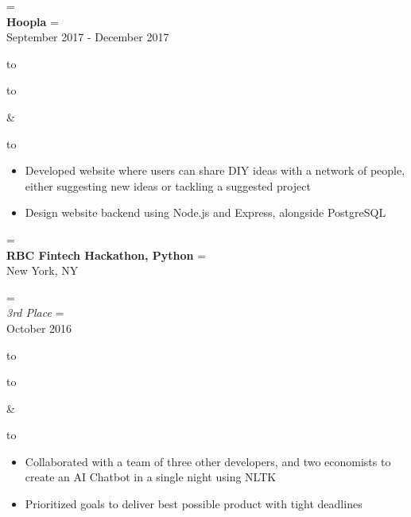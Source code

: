 \documentclass{article}
\newcommand{\appendtotoks}[2]{%
  #1=\expandafter{\the#1#2}%
}
\def\gobble#1{}
\def\gobblefirst#1{%
  #1\expandafter\expandafter\expandafter{\expandafter\gobble\the#1}}
\newcommand{\sectionTitle}[1]{{\Large #1} \vspace{4pt}}
\newenvironment{resumesection}[1]
  {\sectionTitle{#1}}
	{\vspace{10pt}}
\newcommand{\placeStyle}[1]{\textbf{#1}}
\newcommand{\positionStyle}[1]{\textit{#1}}
\newenvironment{newplace}
  {
    \newtoks\leftToks
    \newtoks\rightToks
    \newcommand{\placerow}[2]{%
      \appendtotoks{\leftToks}{\\\placeStyle{##1}}%
      \appendtotoks{\rightToks}{\\##2}}
    \newcommand{\jobrow}[2]{%
      \appendtotoks{\leftToks}{\\\positionStyle{##1}}%
      \appendtotoks{\rightToks}{\\##2}}
    \newcommand{\plainrow}[2]{%
      \appendtotoks{\leftToks}{\\##1}%
      \appendtotoks{\rightToks}{\\##2}}
    \setlength{\tabcolsep}{0pt}%
  }
  {%
    \begin{tabu} to \linewidth [h!]{X[65,l]X[35,r]}
      \begin{tabu} to \linewidth {X}
        \gobblefirst\leftToks
        \the\leftToks
      \end{tabu}
      &
      \begin{tabu} to \linewidth {X[r]}
        \gobblefirst\rightToks
        \the\rightToks
      \end{tabu}
    \end{tabu}%
  }
\newenvironment{bullets}
	{\begin{itemize}[noitemsep, topsep=0pt]}
	{\end{itemize}}
\begin{document}
\begin{resumesection}{Projects}


\begin{newplace}
  \placerow{Hoopla}{September 2017 - December 2017}
\end{newplace}

\begin{bullets}
  \item Developed website where users can share DIY ideas with a network
        of people, either suggesting new ideas or tackling a suggested
        project 
  \item Design website backend using Node.js and Express, alongside
        PostgreSQL 
\end{bullets}


\begin{newplace}
  \placerow{RBC Fintech Hackathon, Python}
					 {New York, NY}
	\jobrow  {3rd Place}
				   {October 2016}
\end{newplace}

\begin{bullets}
  \item Collaborated with a team of three other developers, and two
        economists to create an AI Chatbot in a single night using
        NLTK
  \item Prioritized goals to deliver best possible product with tight
        deadlines
\end{bullets}


%



\end{resumesection}
\end{document}
